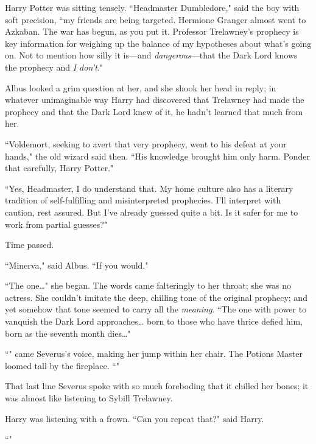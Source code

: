 Harry Potter was sitting tensely. ``Headmaster Dumbledore," said the boy with soft precision, ``my friends are being targeted. Hermione Granger almost went to Azkaban. The war has begun, as you put it. Professor Trelawney's prophecy is key information for weighing up the balance of my hypotheses about what's going on. Not to mention how silly it is—and \emph{dangerous}—that the Dark Lord knows the prophecy and \emph{I don't}."

Albus looked a grim question at her, and she shook her head in reply; in whatever unimaginable way Harry had discovered that Trelawney had made the prophecy and that the Dark Lord knew of it, he hadn't learned that much from her.

``Voldemort, seeking to avert that very prophecy, went to his defeat at your hands," the old wizard said then. ``His knowledge brought him only harm. Ponder that carefully, Harry Potter."

``Yes, Headmaster, I do understand that. My home culture also has a literary tradition of self-fulfilling and misinterpreted prophecies. I'll interpret with caution, rest assured. But I've already guessed quite a bit. Is it safer for me to work from partial guesses?"

Time passed.

``Minerva," said Albus. ``If you would."

``The one{\ldots}" she began. The words came falteringly to her throat; she was no actress. She couldn't imitate the deep, chilling tone of the original prophecy; and yet somehow that tone seemed to carry all the \emph{meaning}. ``The one with power to vanquish the Dark Lord approaches{\ldots} born to those who have thrice defied him, born as the seventh month dies{\ldots}"

``" came Severus's voice, making her jump within her chair. The Potions Master loomed tall by the fireplace. ``"

That last line Severus spoke with so much foreboding that it chilled her bones; it was almost like listening to Sybill Trelawney.

Harry was listening with a frown. ``Can you repeat that?" said Harry.

``"

